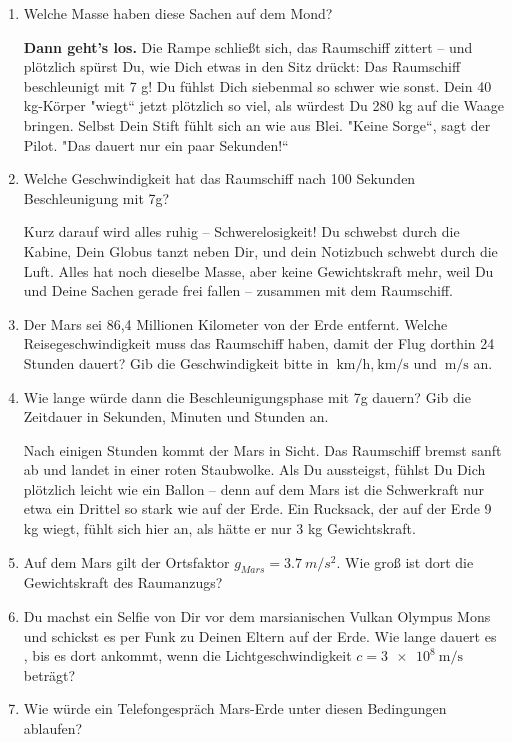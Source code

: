 \documentclass[a4paper]{article}
\begin{document}
\begin{enumerate}[1.]
Werte zur Kontrolle:

\item Welche Masse haben diese Sachen auf dem Mond?

{\bf Dann geht’s los.} Die Rampe schließt sich, das Raumschiff zittert – und plötzlich spürst Du, wie Dich etwas in den Sitz drückt:
Das Raumschiff beschleunigt mit 7 g!
Du fühlst Dich siebenmal so schwer wie sonst.
Dein 40 kg-Körper "wiegt“ jetzt plötzlich so viel, als würdest Du 280 kg auf die Waage bringen. Selbst Dein Stift fühlt sich an wie aus Blei.
"Keine Sorge“, sagt der Pilot. "Das dauert nur ein paar Sekunden!“

\item Welche Geschwindigkeit hat das Raumschiff nach 100 Sekunden Beschleunigung mit 7g?

Kurz darauf wird alles ruhig – Schwerelosigkeit!
Du schwebst durch die Kabine, Dein Globus tanzt neben Dir, und dein Notizbuch schwebt durch die Luft.
Alles hat noch dieselbe Masse, aber keine Gewichtskraft mehr, weil Du und Deine Sachen gerade frei fallen – zusammen mit dem Raumschiff.

\item Der Mars sei 86,4 Millionen Kilometer von der Erde entfernt. Welche Reisegeschwindigkeit muss das Raumschiff haben, damit der Flug dorthin 24 Stunden dauert?
Gib die Geschwindigkeit bitte in $\SI{}{\kilo\meter\per\hour}$,$\SI{}{\kilo\meter\per\second}$ und $\SI{}{\meter\per\second}$ an.
\item Wie lange würde dann die Beschleunigungsphase mit 7g dauern? Gib die Zeitdauer in Sekunden, Minuten und Stunden an.

Nach einigen Stunden kommt der Mars in Sicht. Das Raumschiff bremst sanft ab und landet in einer roten Staubwolke.
Als Du aussteigst, fühlst Du Dich plötzlich leicht wie ein Ballon – denn auf dem Mars ist die Schwerkraft nur etwa ein Drittel so stark wie auf der Erde.
Ein Rucksack, der auf der Erde 9 kg wiegt, fühlt sich hier an, als hätte er nur 3 kg Gewichtskraft.


\item Auf dem Mars gilt der Ortsfaktor $g_{Mars}=\SI{3,7}{m\per s^2} .$ Wie groß ist dort die Gewichtskraft des Raumanzugs?
\item Du machst ein Selfie von Dir vor dem marsianischen Vulkan Olympus Mons und schickst es per Funk zu Deinen Eltern auf der Erde. Wie lange dauert es , bis es dort ankommt, wenn die Lichtgeschwindigkeit $c=\SI{3e8}{\meter\per\second}$ beträgt?
\item Wie würde ein Telefongespräch Mars-Erde unter diesen Bedingungen ablaufen?


\end{enumerate}
\end{document}
